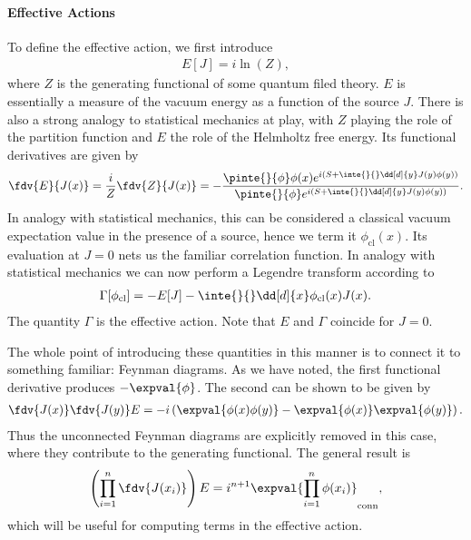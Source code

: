 \paragraph{Effective Actions}
To define the effective action, we first introduce
\begin{align*}
	E[J] = i\ln(Z),
\end{align*}
where $Z$ is the generating functional of some quantum filed theory. $E$ is essentially a measure of the vacuum energy as a function of the source $J$. There is also a strong analogy to statistical mechanics at play, with $Z$ playing the role of the partition function and $E$ the role of the Helmholtz free energy. Its functional derivatives are given by
\begin{align*}
	\fdv{E}{J(x)} = \frac{i}{Z}\fdv{Z}{J(x)} = -\frac{\pinte{}{\phi}\phi(x)e^{i\left(S + \inte{}{}\dd[d]{y}J(y)\phi(y)\right)}}{\pinte{}{\phi}e^{i\left(S + \inte{}{}\dd[d]{y}J(y)\phi(y)\right)}}.
\end{align*}
In analogy with statistical mechanics, this can be considered a classical vacuum expectation value in the presence of a source, hence we term it $\phi_{\text{cl}}(x)$. Its evaluation at $J = 0$ nets us the familiar correlation function. In analogy with statistical mechanics we can now perform a Legendre transform according to
\begin{align*}
	\Gamma[\phi_{\text{cl}}] = -E[J] - \inte{}{}\dd[d]{x}\phi_{\text{cl}}(x)J(x).
\end{align*}
The quantity $\Gamma$ is the effective action. Note that $E$ and $\Gamma$ coincide for $J = 0$.

The whole point of introducing these quantities in this manner is to connect it to something familiar: Feynman diagrams. As we have noted, the first functional derivative produces $-\expval{\phi}$. The second can be shown to be given by
\begin{align*}
	\fdv{J(x)}\fdv{J(y)}E = -i\left(\expval{\phi(x)\phi(y)} - \expval{\phi(x)}\expval{\phi(y)}\right).
\end{align*}
Thus the unconnected Feynman diagrams are explicitly removed in this case, where they contribute to the generating functional. The general result is
\begin{align*}
	\left(\prod\limits_{i = 1}^{n}\fdv{J(x_{i})}\right)E = i^{n + 1}\expval{\prod\limits_{i = 1}^{n}\phi(x_{i})}_{\text{conn}},
\end{align*}
which will be useful for computing terms in the effective action.

